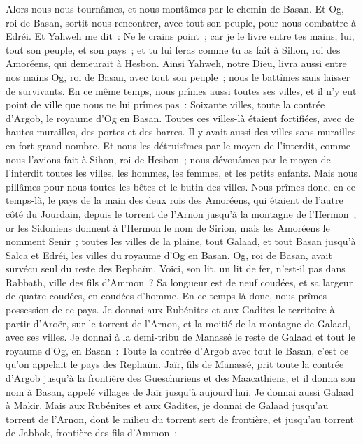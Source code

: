 \begin{multicols}{2}
\VerseOne{}Alors nous nous tournâmes, et nous montâmes par le chemin de Basan. Et Og, roi de Basan, sortit nous rencontrer, avec tout son peuple, pour nous combattre à Edréi.
Et Yahweh me dit~: Ne le crains point~; car je le livre entre tes mains, lui, tout son peuple, et son pays~; et tu lui feras comme tu as fait à Sihon, roi des Amoréens, qui demeurait à Hesbon.
Ainsi Yahweh, notre Dieu, livra aussi entre nos mains Og, roi de Basan, avec tout son peuple~; nous le battîmes sans laisser de survivants.
En ce même temps, nous prîmes aussi toutes ses villes, et il n'y eut point de ville que nous ne lui prîmes pas~: Soixante villes, toute la contrée d'Argob, le royaume d'Og en Basan.
Toutes ces villes-là étaient fortifiées, avec de hautes murailles, des portes et des barres. Il y avait aussi des villes sans murailles en fort grand nombre.
Et nous les détruisîmes par le moyen de l'interdit, comme nous l'avions fait à Sihon, roi de Hesbon~; nous dévouâmes par le moyen de l'interdit toutes les villes, les hommes, les femmes, et les petits enfants.
Mais nous pillâmes pour nous toutes les bêtes et le butin des villes.
Nous prîmes donc, en ce temps-là, le pays de la main des deux rois des Amoréens, qui étaient de l'autre côté du Jourdain, depuis le torrent de l'Arnon jusqu'à la montagne de l'Hermon~;
or les Sidoniens donnent à l'Hermon le nom de Sirion, mais les Amoréens le nomment Senir~;
toutes les villes de la plaine, tout Galaad, et tout Basan jusqu'à Salca et Edréi, les villes du royaume d'Og en Basan.
Og, roi de Basan, avait survécu seul du reste des Rephaïm. Voici, son lit, un lit de fer, n'est-il pas dans Rabbath, ville des fils d'Ammon~? Sa longueur est de neuf coudées, et sa largeur de quatre coudées, en coudées d'homme.
En ce temps-là donc, nous prîmes possession de ce pays. Je donnai aux Rubénites et aux Gadites le territoire à partir d'Aroër, sur le torrent de l'Arnon, et la moitié de la montagne de Galaad, avec ses villes.
Je donnai à la demi-tribu de Manassé le reste de Galaad et tout le royaume d'Og, en Basan~: Toute la contrée d'Argob avec tout le Basan, c'est ce qu'on appelait le pays des Rephaïm.
Jaïr, fils de Manassé, prit toute la contrée d'Argob jusqu'à la frontière des Gueschuriens et des Maacathiens, et il donna son nom à Basan, appelé villages de Jaïr jusqu'à aujourd'hui.
Je donnai aussi Galaad à Makir.
Mais aux Rubénites et aux Gadites, je donnai de Galaad jusqu'au torrent de l'Arnon, dont le milieu du torrent sert de frontière, et jusqu'au torrent de Jabbok, frontière des fils d'Ammon~;

\end{multicols}
